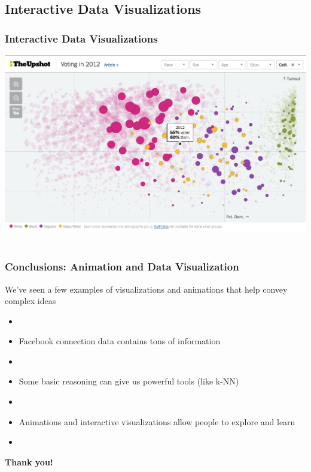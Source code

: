 \documentclass{beamer} %
\newcommand{\1}{\mathbb{1}}
\begin{document}
\subsection{Interactive Data Visualizations}
\begin{frame}[t]\frametitle{Interactive Data Visualizations}
\includegraphics[scale = 0.33]{./visualization/voting_habits_viz.png}\\
\href{http://www.nytimes.com/interactive/2016/06/10/upshot/voting-habits-turnout-partisanship.html}
{}\\	
\end{frame}














\begin{frame}[t]\frametitle{Conclusions: Animation and Data Visualization}
{\large{We've seen a few examples of visualizations and animations that help convey complex ideas}}
\begin{itemize}
	\item[]
	\item Facebook connection data contains tons of information
	\item[]
	\item Some basic reasoning can give us powerful tools (like k-NN)
	\item[]
	\item Animations and interactive visualizations allow people to explore and learn
	\item[]
\end{itemize}
{\bf{\Large{Thank you!}}}
\end{frame}
\end{document}
